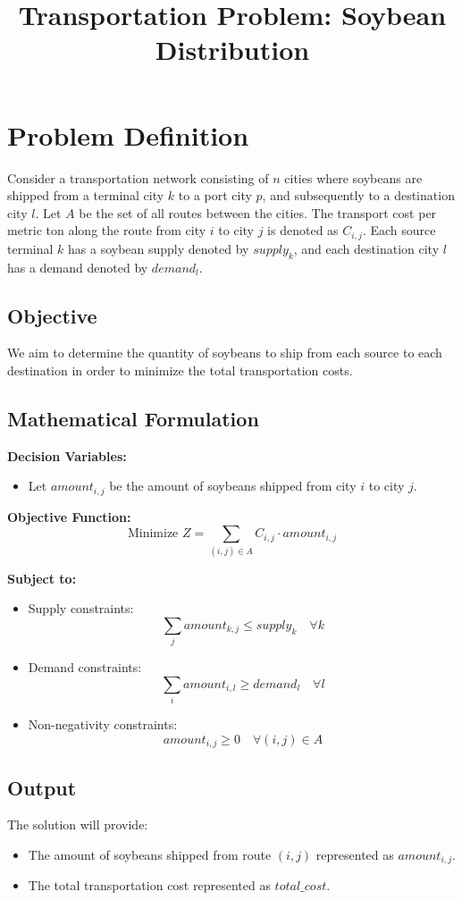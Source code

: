 \documentclass{article}
\begin{document}
\title{Transportation Problem: Soybean Distribution}
\author{}
\date{}
\maketitle

\section*{Problem Definition}
Consider a transportation network consisting of \( n \) cities where soybeans are shipped from a terminal city \( k \) to a port city \( p \), and subsequently to a destination city \( l \). 
Let \( A \) be the set of all routes between the cities. 
The transport cost per metric ton along the route from city \( i \) to city \( j \) is denoted as \( C_{i,j} \). 
Each source terminal \( k \) has a soybean supply denoted by \( supply_k \), and each destination city \( l \) has a demand denoted by \( demand_l \).

\subsection*{Objective}
We aim to determine the quantity of soybeans to ship from each source to each destination in order to minimize the total transportation costs.

\subsection*{Mathematical Formulation}

\textbf{Decision Variables:}
\begin{itemize}
    \item Let \( amount_{i,j} \) be the amount of soybeans shipped from city \( i \) to city \( j \).
\end{itemize}

\textbf{Objective Function:}
\[
\text{Minimize } Z = \sum_{(i,j) \in A} C_{i,j} \cdot amount_{i,j}
\]

\textbf{Subject to:}
\begin{itemize}
    \item Supply constraints:
    \[
    \sum_{j} amount_{k,j} \leq supply_k \quad \forall k
    \]
    
    \item Demand constraints:
    \[
    \sum_{i} amount_{i,l} \geq demand_l \quad \forall l
    \]
    
    \item Non-negativity constraints:
    \[
    amount_{i,j} \geq 0 \quad \forall (i,j) \in A
    \]
\end{itemize}

\subsection*{Output}
The solution will provide:
\begin{itemize}
    \item The amount of soybeans shipped from route \( (i,j) \) represented as \( amount_{i,j} \).
    \item The total transportation cost represented as \( total\_cost \).
\end{itemize}
\end{document}
